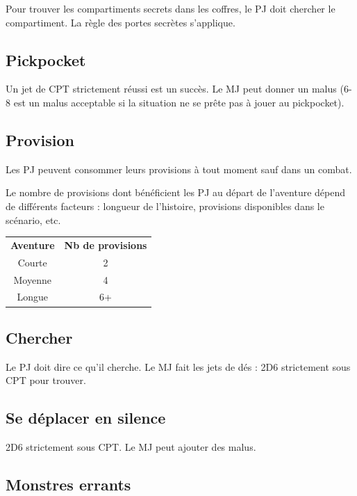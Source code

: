\documentclass[a4paper, 11pt, twoside]{article}
\begin{document}
Pour trouver les compartiments secrets dans les coffres, le PJ doit chercher le compartiment. La règle des portes secrètes s'applique.

\subsection{Pickpocket}
\label{sec:orgef0a5bf}

Un jet de CPT strictement réussi est un succès. Le MJ peut donner un malus (6-8 est un malus acceptable si la situation ne se prête pas à jouer au pickpocket).

\subsection{Provision}
\label{sec:org796d271}

Les PJ peuvent consommer leurs provisions à tout moment sauf dans un combat.

Le nombre de provisions dont bénéficient les PJ au départ de l'aventure dépend de différents facteurs : longueur de l'histoire, provisions disponibles dans le scénario, etc.

\begin{longtable}{cc}
\textbf{Aventure} & \textbf{Nb de provisions}\\
Courte & 2\\
Moyenne & 4\\
Longue & 6+\\
\end{longtable}

\subsection{Chercher}
\label{sec:orge3b665d}

Le PJ doit dire ce qu'il cherche. Le MJ fait les jets de dés : 2D6 strictement sous CPT pour trouver.

\subsection{Se déplacer en silence}
\label{sec:org300c687}

2D6 strictement sous CPT. Le MJ peut ajouter des malus.

\subsection{Monstres errants}
\label{sec:org47b7cec}
\end{document}
